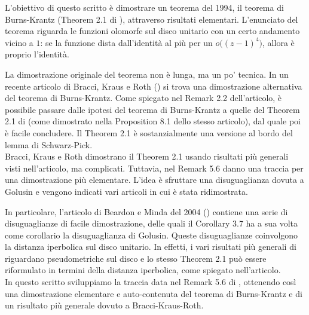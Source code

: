 L'obiettivo di questo scritto è dimostrare un teorema del 1994, il teorema di Burns-Krantz (Theorem 2.1 di \cite{BK}), attraverso risultati elementari. L'enunciato del teorema riguarda le funzioni olomorfe sul disco unitario con un certo andamento vicino a $1$: se la funzione dista dall'identità al più per un $o\bigl((z-1)^4\bigr)$, allora è proprio l'identità.

La dimostrazione originale del teorema non è lunga, ma un po' tecnica. In un recente articolo di Bracci, Kraus e Roth (\cite{BKR}) si trova una dimostrazione alternativa del teorema di Burns-Krantz. Come spiegato nel Remark 2.2 dell'articolo, è possibile passare dalle ipotesi del teorema di Burns-Krantz a quelle del Theorem 2.1 di \cite{BKR} (come dimostrato nella Proposition 8.1 dello stesso articolo), dal quale poi è facile concludere. Il Theorem 2.1 è sostanzialmente una versione al bordo del lemma di Schwarz-Pick. \\

Bracci, Kraus e Roth dimostrano il Theorem 2.1 usando risultati più generali visti nell'articolo, ma complicati. Tuttavia, nel Remark 5.6 danno una traccia per una dimostrazione più elementare. L'idea è sfruttare una disuguaglianza dovuta a Golusin e vengono indicati vari articoli in cui è stata ridimostrata.

In particolare, l'articolo di Beardon e Minda del 2004 (\cite{BM}) contiene una serie di disuguaglianze di facile dimostrazione, delle quali il Corollary 3.7 ha a sua volta come corollario la disuguaglianza di Golusin. Queste disuguaglianze coinvolgono la distanza iperbolica sul disco unitario. In effetti, i vari risultati più generali di \cite{BK} riguardano pseudometriche sul disco e lo stesso Theorem 2.1 può essere riformulato in termini della distanza iperbolica, come spiegato nell'articolo. \\

In questo scritto sviluppiamo la traccia data nel Remark 5.6 di \cite{BKR}, ottenendo così una dimostrazione elementare e auto-contenuta del teorema di Burns-Krantz e di un risultato più generale dovuto a Bracci-Kraus-Roth.
